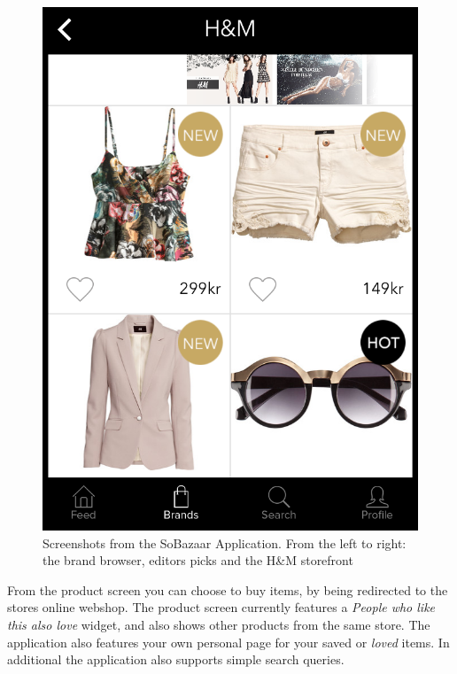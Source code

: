 \begin{figure}[H]
\begin{minipage}{.3\linewidth}
			  \includegraphics[height=1.5\linewidth]{image/SoBazaarStore.png}
		\end{minipage}
		\caption[SoBazaar storefront screenshots - version 0.5.1]{Screenshots from the SoBazaar Application. From the left to right: the brand browser, editors picks and the H\&M storefront}
		\label{figure:SoBazaarfeed}
	\end{figure}

	From the product screen you can choose to buy items, by being redirected to the stores online webshop. The product screen currently features a \emph{People who like this also love} widget, and also shows other products from the same store. The application also features your own personal page for your saved or \emph{loved} items. In additional the application
	also supports simple search queries.

